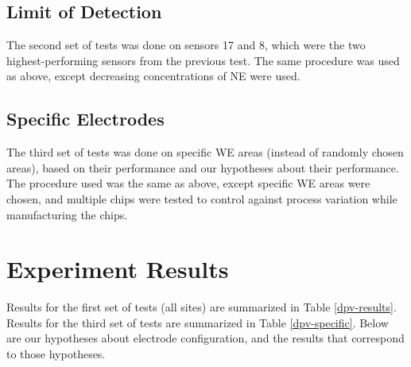\subsection{Limit of Detection}

The second set of tests was done on sensors 17 and 8, which were the two highest-performing sensors from the previous test. The same procedure was used as above, except decreasing concentrations of NE were used.

\subsection{Specific Electrodes}

The third set of tests was done on specific WE areas (instead of randomly chosen areas), based on their performance and our hypotheses about their performance. The procedure used was the same as above, except specific WE areas were chosen, and multiple chips were tested to control against process variation while manufacturing the chips.

\section{Experiment Results}

Results for the first set of tests (all sites) are summarized in Table \ref{dpv-results}. Results for the third set of tests are summarized in Table \ref{dpv-specific}. Below are our hypotheses about electrode configuration, and the results that correspond to those hypotheses.

